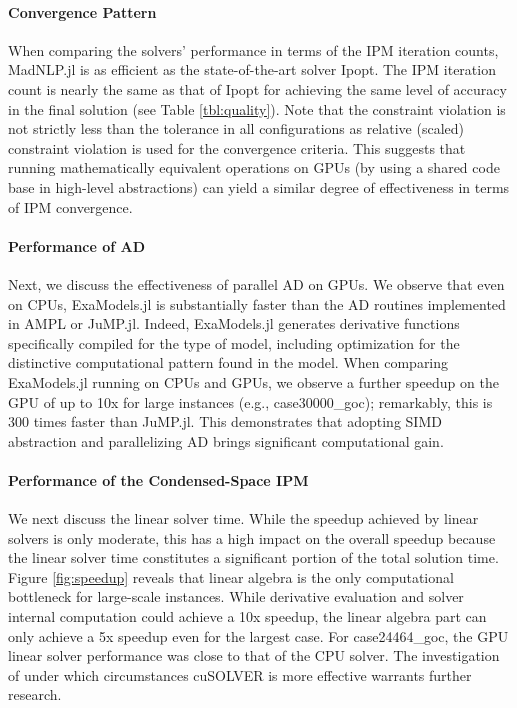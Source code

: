 \documentclass{IEEEtran4PSCC} %
\begin{document}
\paragraph*{Convergence Pattern}
When comparing the solvers' performance in terms of the
IPM iteration counts, MadNLP.jl is as
efficient as the state-of-the-art solver Ipopt. The IPM iteration
count is nearly the same as that of Ipopt for achieving the same level
of accuracy in the final solution (see Table \ref{tbl:quality}).
{\color{blue} Note that
the constraint violation is not strictly less than the tolerance in all configurations
as relative (scaled) constraint violation is used for the convergence criteria.}
This
suggests that running mathematically equivalent operations on GPUs (by
using a shared code base in high-level abstractions) can yield a similar
degree of effectiveness in terms of IPM convergence.

\paragraph*{Performance of AD}
Next, we discuss the effectiveness of parallel AD on GPUs. We observe
that even on CPUs, ExaModels.jl is substantially faster than the AD
routines implemented in AMPL or JuMP.jl. Indeed, ExaModels.jl generates
derivative functions specifically compiled for the type of model,
including optimization for the distinctive computational pattern found
in the model. When comparing ExaModels.jl running on CPUs and GPUs, we
observe a further speedup on the GPU of up to 10x for large
instances (e.g., case30000\_goc); remarkably, this is 300 times faster
than JuMP.jl. This demonstrates that adopting SIMD abstraction and
parallelizing AD brings significant computational gain. 

\paragraph*{Performance of the Condensed-Space IPM}
We next discuss the linear solver time. While the speedup achieved by
linear solvers is only moderate, this has a high impact on the overall
speedup because the linear solver time constitutes a significant
portion of the total solution time. {\color{blue} Figure
\ref{fig:speedup} reveals that linear algebra is the only
computational bottleneck for large-scale instances. While derivative
evaluation and solver internal computation could achieve a 10x speedup,
the linear algebra part can only achieve a 5x speedup even for the
largest case. For case24464\_goc, the GPU linear solver performance
was close to that of the CPU solver.  The investigation of under which
circumstances cuSOLVER is more effective warrants further research.}
\end{document}
